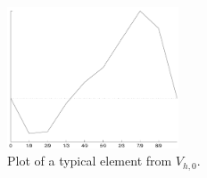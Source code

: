 \begin{figure}[hpt]
\centering
\includegraphics*[width=2in]{figures/femfunction1.pdf}
\caption{Plot of a typical element from $V_{h,0}$.} 
\label{fig:1dtypical}
\end{figure}





